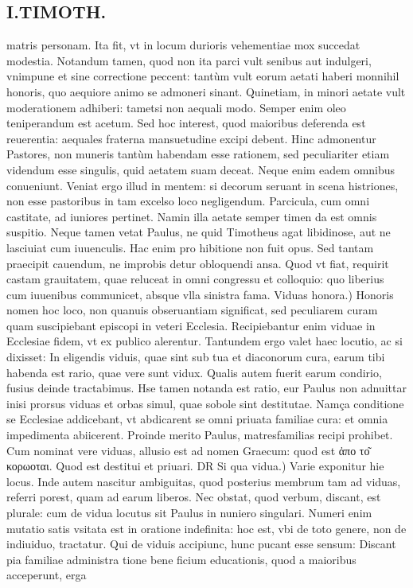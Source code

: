 \documentclass{article}
\begin{document}
\begin{pages}
\section*{I.TIMOTH. }
\marginpar{[ p.56 ]}\pstart matris personam. Ita fit, vt in locum durioris vehementiae mox succedat modestia. Notandum tamen, quod non ita parci vult senibus aut indulgeri, vnimpune et sine correctione peccent: tantùm vult eorum aetati haberi monnihil honoris, quo aequiore animo se admoneri sinant. Quinetiam, in minori aetate vult moderationem adhiberi: tametsi non aequali modo. Semper enim oleo teniperandum est acetum. Sed hoc interest, quod maioribus deferenda est reuerentia: aequales fraterna mansuetudine excipi debent. Hinc admonentur Pastores, non muneris tantùm habendam esse rationem, sed peculiariter etiam videndum esse singulis, quid aetatem suam deceat. Neque enim eadem omnibus conueniunt. Veniat ergo illud in mentem: si decorum seruant in scena histriones, non esse pastoribus in tam excelso loco negligendum. Parcicula, cum omni castitate, ad iuniores pertinet. Namin illa aetate semper timen da est omnis suspitio. Neque tamen vetat Paulus, ne quid Timotheus agat libidinose, aut ne lasciuiat cum iuuenculis. Hac enim pro hibitione non fuit opus. Sed tantam praecipit cauendum, ne improbis detur obloquendi ansa. Quod vt fiat, requirit castam grauitatem, quae reluceat in omni congressu et colloquio: quo liberius cum iuuenibus communicet, absque vlla sinistra fama.  \pend\pstart Viduas honora.) Honoris nomen hoc loco, non quanuis obseruantiam significat, sed peculiarem curam quam suscipiebant episcopi in veteri Ecclesia. Recipiebantur enim viduae in Ecclesiae fidem, vt ex publico alerentur. Tantundem ergo valet haec locutio, ac si dixisset: In eligendis viduis, quae sint sub tua et diaconorum cura, earum tibi habenda est rario, quae vere sunt vidux. Qualis autem fuerit earum condirio, fusius deinde tractabimus. Hse tamen notanda est ratio, eur Paulus non adnuittar inisi prorsus viduas et orbas simul, quae sobole sint destitutae. Namça conditione se Ecclesiae addicebant, vt abdicarent se omni priuata familiae cura: et omnia impedimenta abiicerent. Proinde merito Paulus, matresfamilias recipi prohibet. Cum nominat vere viduas, allusio est ad nomen Graecum: quod est ἀπο το͂ κορωοται. Quod est destitui et priuari. DR  \pend\pstart Si qua vidua.) Varie exponitur hie locus. Inde autem nascitur ambiguitas, quod posterius membrum tam ad viduas, referri porest, quam ad earum liberos. Nec obstat, quod verbum, discant, est plurale: cum de vidua locutus sit Paulus in nuniero singulari. Numeri enim mutatio satis vsitata est in oratione indefinita: hoc est, vbi de toto genere, non de indiuiduo, tractatur. Qui de viduis accipiunc, hunc pucant esse sensum: Discant pia familiae administra tione bene ficium educationis, quod a maioribus acceperunt, erga  \pend

\end{pages}
\end{document}
